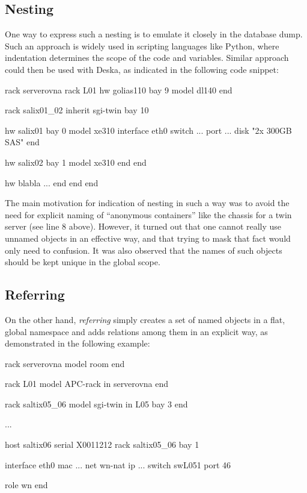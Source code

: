 \documentclass[12pt]{article}
\begin{document}
\subsection{Nesting}

One way to express such a nesting is to emulate it closely in the database dump.
Such an approach is widely used in scripting languages like Python, where
indentation determines the scope of the code and variables.  Similar approach
could then be used with Deska, as indicated in the following code snippet:

\begin{listing}{1}
rack serverovna
    rack L01
        hw golias110
            bay 9
            model dl140
        end

        rack salix01_02
            inherit sgi-twin
            bay 10

            hw salix01
                bay 0
                model xe310
                interface eth0 switch ... port ...
                disk "2x 300GB SAS"
            end

            hw salix02
                bay 1
                model xe310
            end
        end

        hw blabla
            ...
        end
    end
end
\end{listing}

The main motivation for indication of nesting in such a way was to avoid the
need for explicit naming of ``anonymous containers'' like the chassis for a twin
server (see line 8 above).  However, it turned out that one cannot really use
unnamed objects in an effective way, and that trying to mask that fact would
only need to confusion.  It was also observed that the names of such objects
should be kept unique in the global scope.

\subsection{Referring}

On the other hand, {\em referring} simply creates a set of named objects in a
flat, global namespace and adds relations among them in an explicit way, as
demonstrated in the following example:

\begin{listing}{1}
rack serverovna
    model room
end

rack L01
    model APC-rack
    in serverovna
end

rack saltix05_06
    model sgi-twin
    in L05 bay 3
end

...

host saltix06
    serial X0011212
    rack saltix05_06 bay 1

    interface eth0 mac ... net wn-nat ip ... switch swL051 port 46

    role wn
end
\end{listing}
\end{document}
